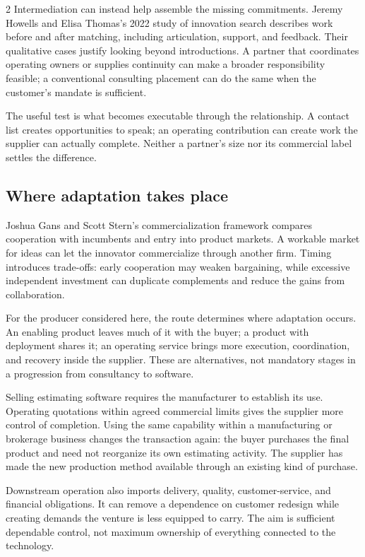 \begin{multicols}{2}
Intermediation can instead help assemble the missing commitments. Jeremy
Howells and Elisa Thomas's 2022 study of innovation search
\citep{howells2022search} describes work before and after matching,
including articulation, support, and feedback. Their qualitative cases
justify looking beyond introductions. A partner that coordinates
operating owners or supplies continuity can make a broader
responsibility feasible; a conventional consulting placement can do the
same when the customer's mandate is sufficient.

The useful test is what becomes executable through the relationship. A
contact list creates opportunities to speak; an operating contribution
can create work the supplier can actually complete. Neither a partner's
size nor its commercial label settles the difference.

\subsection{Where adaptation takes
place}\label{where-adaptation-takes-place}

Joshua Gans and Scott Stern's commercialization framework
\citep{gans2003commercialization} compares cooperation with incumbents
and entry into product markets. A workable market for ideas can let the
innovator commercialize through another firm. Timing introduces
trade-offs: early cooperation may weaken bargaining, while excessive
independent investment can duplicate complements and reduce the gains
from collaboration.

For the producer considered here, the route determines where adaptation
occurs. An enabling product leaves much of it with the buyer; a product
with deployment shares it; an operating service brings more execution,
coordination, and recovery inside the supplier. These are alternatives,
not mandatory stages in a progression from consultancy to software.

Selling estimating software requires the manufacturer to establish its
use. Operating quotations within agreed commercial limits gives the
supplier more control of completion. Using the same capability within a
manufacturing or brokerage business changes the transaction again: the
buyer purchases the final product and need not reorganize its own
estimating activity. The supplier has made the new production method
available through an existing kind of purchase.

Downstream operation also imports delivery, quality, customer-service,
and financial obligations. It can remove a dependence on customer
redesign while creating demands the venture is less equipped to carry.
The aim is sufficient dependable control, not maximum ownership of
everything connected to the technology.


\end{multicols}
